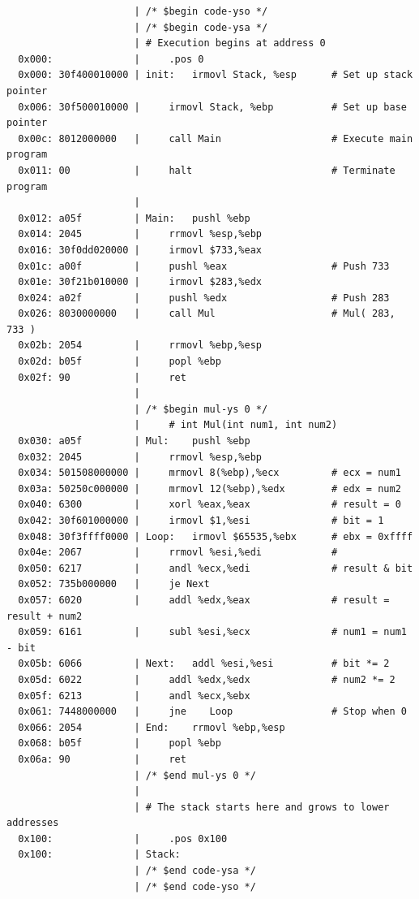 \documentclass[12pt]{article}
\begin{document}
\begin{CJK*}{GB}{gbsn}
\begin{verbatim}
                      | /* $begin code-yso */
                      | /* $begin code-ysa */
                      | # Execution begins at address 0
  0x000:              |     .pos 0
  0x000: 30f400010000 | init:   irmovl Stack, %esp      # Set up stack pointer
  0x006: 30f500010000 |     irmovl Stack, %ebp          # Set up base pointer
  0x00c: 8012000000   |     call Main                   # Execute main program
  0x011: 00           |     halt                        # Terminate program
                      | 
  0x012: a05f         | Main:   pushl %ebp
  0x014: 2045         |     rrmovl %esp,%ebp
  0x016: 30f0dd020000 |     irmovl $733,%eax
  0x01c: a00f         |     pushl %eax                  # Push 733
  0x01e: 30f21b010000 |     irmovl $283,%edx
  0x024: a02f         |     pushl %edx                  # Push 283
  0x026: 8030000000   |     call Mul                    # Mul( 283, 733 )
  0x02b: 2054         |     rrmovl %ebp,%esp
  0x02d: b05f         |     popl %ebp
  0x02f: 90           |     ret
                      | 
                      | /* $begin mul-ys 0 */
                      |     # int Mul(int num1, int num2)
  0x030: a05f         | Mul:    pushl %ebp
  0x032: 2045         |     rrmovl %esp,%ebp
  0x034: 501508000000 |     mrmovl 8(%ebp),%ecx         # ecx = num1
  0x03a: 50250c000000 |     mrmovl 12(%ebp),%edx        # edx = num2
  0x040: 6300         |     xorl %eax,%eax              # result = 0
  0x042: 30f601000000 |     irmovl $1,%esi              # bit = 1
  0x048: 30f3ffff0000 | Loop:   irmovl $65535,%ebx      # ebx = 0xffff
  0x04e: 2067         |     rrmovl %esi,%edi            #
  0x050: 6217         |     andl %ecx,%edi              # result & bit
  0x052: 735b000000   |     je Next
  0x057: 6020         |     addl %edx,%eax              # result = result + num2
  0x059: 6161         |     subl %esi,%ecx              # num1 = num1 - bit
  0x05b: 6066         | Next:   addl %esi,%esi          # bit *= 2
  0x05d: 6022         |     addl %edx,%edx              # num2 *= 2
  0x05f: 6213         |     andl %ecx,%ebx
  0x061: 7448000000   |     jne    Loop                 # Stop when 0
  0x066: 2054         | End:    rrmovl %ebp,%esp
  0x068: b05f         |     popl %ebp
  0x06a: 90           |     ret
                      | /* $end mul-ys 0 */
                      | 
                      | # The stack starts here and grows to lower addresses
  0x100:              |     .pos 0x100
  0x100:              | Stack:
                      | /* $end code-ysa */
                      | /* $end code-yso */
\end{verbatim}


\end{CJK*}
\end{document}
